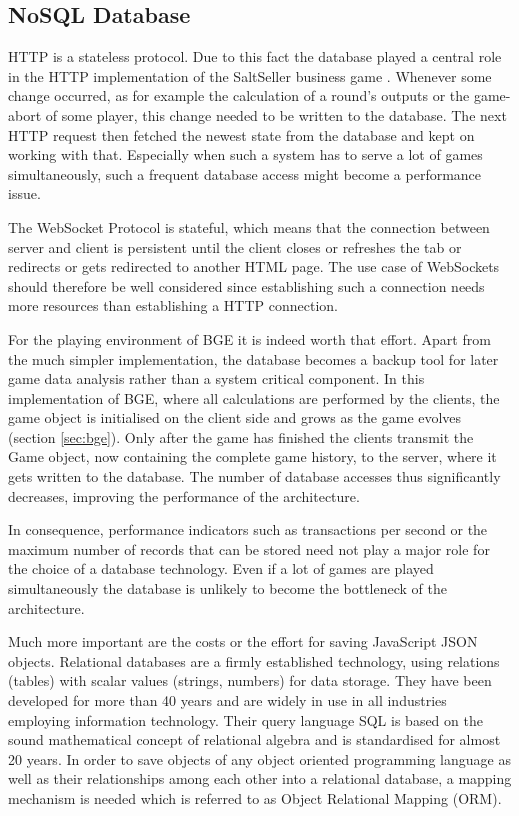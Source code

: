 \subsection{NoSQL Database}

HTTP is a stateless protocol. Due to this fact the database played a central role in the HTTP implementation of the SaltSeller business game \cite{saltseller}. Whenever some change occurred, as for example the calculation of a round's outputs or the game-abort of some player, this change needed to be written to the database. The next HTTP request then fetched the newest state from the database and kept on working with that. Especially when such a system has to serve a lot of games simultaneously, such a frequent database access might become a performance issue.

The WebSocket Protocol is stateful, which means that the connection between server and client is persistent until the client closes or refreshes the tab or redirects or gets redirected to another HTML page. The use case of WebSockets should therefore be well considered since establishing such a connection needs more resources than establishing a HTTP connection. 

For the playing environment of BGE it is indeed worth that effort. Apart from the much simpler implementation, the database becomes a backup tool for later game data analysis rather than a system critical component. In this implementation of BGE, where all calculations are performed by the clients, the game object is initialised on the client side and grows as the game evolves (section \ref{sec:bge}). Only after the game has finished the clients transmit the Game object, now containing the complete game history, to the server, where it gets written to the database. The number of database accesses thus significantly decreases, improving the performance of the architecture.

In consequence, performance indicators such as transactions per second or the maximum number of records that can be stored need not play a major role for the choice of a database technology. Even if a lot of games are played simultaneously the database is unlikely to become the bottleneck of the architecture. 

Much more important are the costs or the effort for saving JavaScript JSON objects. Relational databases are a firmly established technology, using relations (tables) with scalar values (strings, numbers) for data storage. They have been developed for more than 40 years and are widely in use in all industries employing information technology. Their query language SQL is based on the sound mathematical concept of relational algebra and is standardised for almost 20 years. In order to save objects of any object oriented programming language as well as their relationships among each other into a relational database, a mapping mechanism is needed which is referred to as Object Relational Mapping (ORM).

